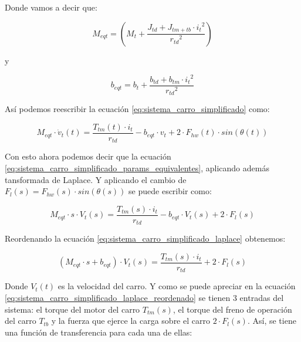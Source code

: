 \documentclass[11pt]{article}
\begin{document}
Donde vamos a decir que:

\begin{equation}
	\label{eq:sistema_carro_masa_equivalente}
	M_{eqt} = \left ( M_{t}+ \frac{J_{td}+J_{tm+tb}\cdot{i_{t}}^{2}}{{r_{td}}^{2}} \right )
\end{equation}

y

\begin{equation}
	\label{eq:sistema_carro_friccion_equivalente}
	b_{eqt} = b_{t} +\frac{b_{td}+b_{tm}\cdot{i_{t}}^{2}}{{r_{td}}^{2}}
\end{equation}

Así podemos reescribir la ecuación \ref{eq:sistema_carro_simplificado} como:

\begin{equation}
	\label{eq:sistema_carro_simplificado_params_equivalentes}
	M_{eqt}\cdot\dot{v}_{t}(t)=\frac{T_{tm}(t)\cdot i_{t}}{r_{td}}-b_{eqt}\cdot v_{t} + 2\cdot F_{hw}(t) \cdot sin \left ( \theta(t) \right )
\end{equation}

Con esto ahora podemos decir que la ecuación \ref{eq:sistema_carro_simplificado_params_equivalentes}, aplicando además tansformada de Laplace. Y aplicando el cambio de $F_{l}(s)=F_{hw}(s) \cdot sin \left ( \theta(s) \right )$ se puede escribir como:

\begin{equation}
	\label{eq:sistema_carro_simplificado_laplace}
	M_{eqt}\cdot s\cdot V_{t}(s) = \frac{T_{tm}(s)\cdot i_{t}}{r_{td}}-b_{eqt}\cdot V_{t}(s) + 2\cdot F_{l}(s)
\end{equation}

Reordenando la ecuación \ref{eq:sistema_carro_simplificado_laplace} obtenemos:

\begin{equation}
	\label{eq:sistema_carro_simplificado_laplace_reordenado}
	\left ( M_{eqt}\cdot s+b_{eqt} \right )\cdot V_{t}(s) = \frac{T_{tm}(s)\cdot i_{t}}{r_{td}}+ 2\cdot F_{l}(s)
\end{equation}

Donde $V_{t}(t)$ es la velocidad del carro. Y como se puede apreciar en la ecuación \ref{eq:sistema_carro_simplificado_laplace_reordenado} se tienen 3 entradas del sistema: el torque del motor del carro $T_{tm}(s)$, el torque del freno de operación del carro $T_{tb}$ y la fuerza que ejerce la carga sobre el carro $2\cdot F_{l}(s)$. Así, se tiene una función de transferencia para cada una de ellas:
\end{document}
